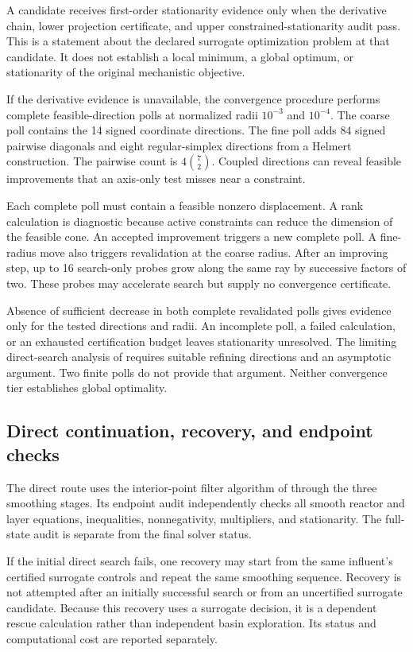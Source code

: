 A candidate receives first-order stationarity evidence only when the derivative chain, lower projection certificate, and upper constrained-stationarity audit pass. This is a statement about the declared surrogate optimization problem at that candidate. It does not establish a local minimum, a global optimum, or stationarity of the original mechanistic objective.

If the derivative evidence is unavailable, the convergence procedure performs complete feasible-direction polls at normalized radii $10^{-3}$ and $10^{-4}$. The coarse poll contains the 14 signed coordinate directions. The fine poll adds 84 signed pairwise diagonals and eight regular-simplex directions from a Helmert construction. The pairwise count is $4\binom72$. Coupled directions can reveal feasible improvements that an axis-only test misses near a constraint.

Each complete poll must contain a feasible nonzero displacement. A rank calculation is diagnostic because active constraints can reduce the dimension of the feasible cone. An accepted improvement triggers a new complete poll. A fine-radius move also triggers revalidation at the coarse radius. After an improving step, up to 16 search-only probes grow along the same ray by successive factors of two. These probes may accelerate search but supply no convergence certificate.

Absence of sufficient decrease in both complete revalidated polls gives evidence only for the tested directions and radii. An incomplete poll, a failed calculation, or an exhausted certification budget leaves stationarity unresolved. The limiting direct-search analysis of \citet{AudetDennis2006} requires suitable refining directions and an asymptotic argument. Two finite polls do not provide that argument. Neither convergence tier establishes global optimality.

\subsection{Direct continuation, recovery, and endpoint checks}

The direct route uses the interior-point filter algorithm of \citet{WachterBiegler2006} through the three smoothing stages. Its endpoint audit independently checks all smooth reactor and layer equations, inequalities, nonnegativity, multipliers, and stationarity. The full-state audit is separate from the final solver status.

If the initial direct search fails, one recovery may start from the same influent's certified surrogate controls and repeat the same smoothing sequence. Recovery is not attempted after an initially successful search or from an uncertified surrogate candidate. Because this recovery uses a surrogate decision, it is a dependent rescue calculation rather than independent basin exploration. Its status and computational cost are reported separately.


